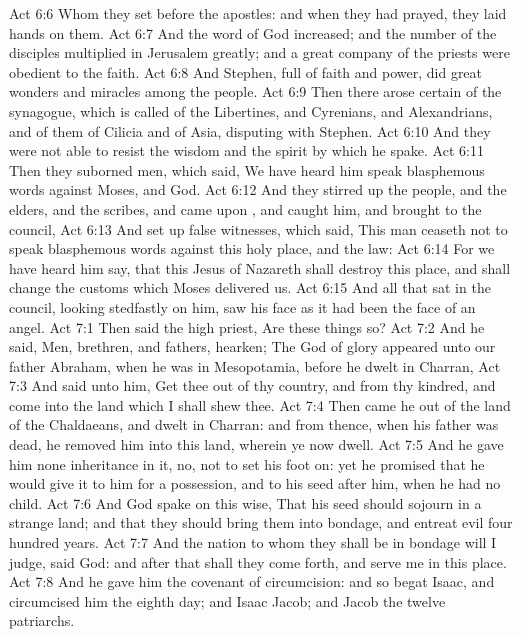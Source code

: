 \vs Act 6:6 Whom they set before the apostles: and when they had prayed, they laid  hands on them.
\vs Act 6:7 And the word of God increased; and the number of the disciples multiplied in Jerusalem greatly; and a great company of the priests were obedient to the faith.
\vs Act 6:8 And Stephen, full of faith and power, did great wonders and miracles among the people.
\vs Act 6:9 Then there arose certain of the synagogue, which is called  of the Libertines, and Cyrenians, and Alexandrians, and of them of Cilicia and of Asia, disputing with Stephen.
\vs Act 6:10 And they were not able to resist the wisdom and the spirit by which he spake.
\vs Act 6:11 Then they suborned men, which said, We have heard him speak blasphemous words against Moses, and  God.
\vs Act 6:12 And they stirred up the people, and the elders, and the scribes, and came upon , and caught him, and brought  to the council,
\vs Act 6:13 And set up false witnesses, which said, This man ceaseth not to speak blasphemous words against this holy place, and the law:
\vs Act 6:14 For we have heard him say, that this Jesus of Nazareth shall destroy this place, and shall change the customs which Moses delivered us.
\vs Act 6:15 And all that sat in the council, looking stedfastly on him, saw his face as it had been the face of an angel.
\vs Act 7:1 Then said the high priest, Are these things so?
\vs Act 7:2 And he said, Men, brethren, and fathers, hearken; The God of glory appeared unto our father Abraham, when he was in Mesopotamia, before he dwelt in Charran,
\vs Act 7:3 And said unto him, Get thee out of thy country, and from thy kindred, and come into the land which I shall shew thee.
\vs Act 7:4 Then came he out of the land of the Chaldaeans, and dwelt in Charran: and from thence, when his father was dead, he removed him into this land, wherein ye now dwell.
\vs Act 7:5 And he gave him none inheritance in it, no, not  to set his foot on: yet he promised that he would give it to him for a possession, and to his seed after him, when  he had no child.
\vs Act 7:6 And God spake on this wise, That his seed should sojourn in a strange land; and that they should bring them into bondage, and entreat  evil four hundred years.
\vs Act 7:7 And the nation to whom they shall be in bondage will I judge, said God: and after that shall they come forth, and serve me in this place.
\vs Act 7:8 And he gave him the covenant of circumcision: and so  begat Isaac, and circumcised him the eighth day; and Isaac  Jacob; and Jacob  the twelve patriarchs.
